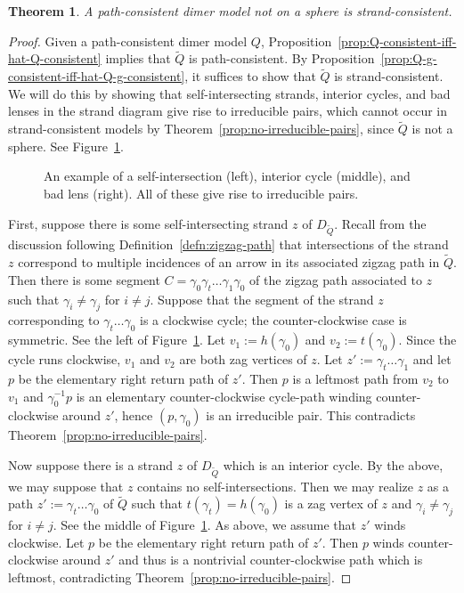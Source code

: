 \documentclass{article}
\newtheorem{thm}{Theorem}[section]
\theoremstyle{definition}
\begin{document}
\begin{thm}\label{thm:good-quiver-no-bad-configurations}
	A path-consistent dimer model not on a sphere is strand-consistent.
\end{thm}
\begin{proof}
	Given a path-consistent dimer model $Q$, Proposition~\ref{prop:Q-consistent-iff-hat-Q-consistent} implies that $\widetilde Q$ is path-consistent. By Proposition~\ref{prop:Q-g-consistent-iff-hat-Q-g-consistent}, it suffices to show that $\widetilde Q$ is strand-consistent. We will do this by showing that self-intersecting strands, interior cycles, and bad lenses in the strand diagram give rise to irreducible pairs, which cannot occur in strand-consistent models by Theorem~\ref{prop:no-irreducible-pairs}, since $\widetilde Q$ is not a sphere. See Figure~\ref{fig:triple}.
	\def\svgwidth{400pt}
	\begin{figure}		\centering
		
		\caption{An example of a self-intersection (left), interior cycle (middle), and bad lens (right). All of these give rise to irreducible pairs.}
		\label{fig:triple}
	\end{figure}


	First, suppose there is some self-intersecting strand $z$ of $D_{\widetilde Q}$. Recall from the discussion following Definition~\ref{defn:zigzag-path} that intersections of the strand $z$ correspond to multiple incidences of an arrow in its associated zigzag path in ${\widetilde Q}$. Then there is some segment $C=\gamma_0\gamma_t\dots\gamma_1\gamma_0$ of the zigzag path associated to $z$ such that $\gamma_i\neq\gamma_j$ for $i\neq j$. Suppose that the segment of the strand $z$ corresponding to $\gamma_t\dots\gamma_0$ is a clockwise cycle; the counter-clockwise case is symmetric. See the left of Figure~\ref{fig:triple}. Let $v_1:=h(\gamma_0)$ and $v_2:=t(\gamma_0)$. Since the cycle runs clockwise, $v_1$ and $v_2$ are both zag vertices of $z$. Let $z':=\gamma_t\dots\gamma_1$ and let $p$ be the elementary right return path of $z'$. Then $p$ is a leftmost path from $v_2$ to $v_1$ and $\gamma_0^{-1}p$ is an elementary counter-clockwise cycle-path winding counter-clockwise around $z'$, hence $(p,\gamma_0)$ is an irreducible pair. This contradicts Theorem~\ref{prop:no-irreducible-pairs}.



    
	Now suppose there is a strand $z$ of $D_{\widetilde Q}$ which is an interior cycle. By the above, we may suppose that $z$ contains no self-intersections. Then we may realize $z$ as a path $z':=\gamma_t\dots\gamma_0$ of ${\widetilde Q}$ such that $t(\gamma_t)=h(\gamma_0)$ is a zag vertex of $z$ and $\gamma_i\neq\gamma_j$ for $i\neq j$. See the middle of Figure~\ref{fig:triple}. As above, we assume that $z'$ winds clockwise. Let $p$ be the elementary right return path of $z'$. Then $p$ winds counter-clockwise around $z'$ and thus is a nontrivial counter-clockwise path which is leftmost, contradicting Theorem~\ref{prop:no-irreducible-pairs}.
    

\end{proof}
\end{document}
